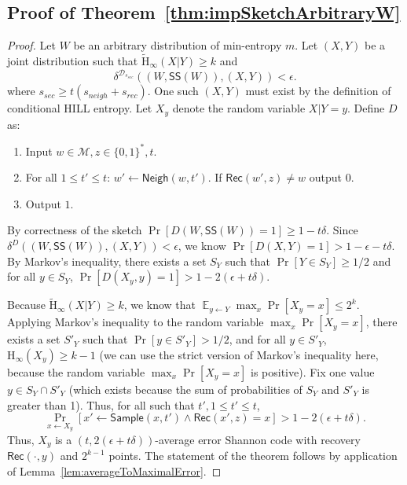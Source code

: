 \documentclass[11pt]{article}
\newcommand{\thref}[1]{\mbox{Theorem~\ref{#1}}}
\newcommand{\lemref}[1]{\mbox{Lemma~\ref{#1}}}
\DeclareMathOperator*{\expe}{\mathbb{E}}
\newcommand{\class}[1]{{\ensuremath{\mathsf{#1}}}}
\newcommand{\sketch}{\ensuremath{\class{SS}}\xspace}
\newcommand{\rec}{\ensuremath{\class{Rec}}\xspace}
\newcommand{\sample}{\ensuremath{\class{Sample}}\xspace}
\newcommand{\neigh}{\ensuremath{\class{Neigh}}\xspace}
\newcommand{\hill}{\ensuremath{\mathtt{HILL}}\xspace}
\newcommand{\Hoo}{\mathrm{H}_\infty}
\newcommand{\Hav}{\tilde{\mathrm{H}}_\infty}
\begin{document}
\subsection{Proof of \thref{thm:impSketchArbitraryW}}
\label{sec:proof of thm sketch implies code}
\begin{proof}
  Let $W$ be an arbitrary distribution of min-entropy $m$.  Let $(X, Y)$ be a joint distribution such that $\Hav(X | Y)\geq k$ and
\[ 
\delta^{\mathcal{D}_{s_{sec}}}((W, \sketch(W)), (X, Y))<\epsilon.
\]  
where  $s_{sec} \geq t(s_{neigh}+s_{rec})$.  One such $(X, Y)$ must exist by the definition of conditional HILL entropy. Let $X_y$ denote the random variable $X|Y=y$.
Define $D$ as:
\begin{enumerate}
\item Input $w\in\mathcal{M}, z \in\{0, 1\}^*, t$.
\item For all $1\leq t'\leq t$: 
\subitem  $w'\leftarrow \neigh(w, t')$.
\subitem If $\rec(w', z) \neq  w$ output $0$.
\item Output $1$.
\end{enumerate}
 By correctness of the sketch $ \Pr[D(W, \sketch(W)) =1]\ge 1-t\delta$.  Since 
$\delta^D((W, \sketch(W)), (X, Y))<\epsilon$, we know $\Pr[D(X, Y) = 1]>1-\epsilon-t\delta$.  By Markov's inequality,  there exists a set $S_Y$ such that $\Pr[Y\in S_Y]\ge 1/2$ and for all $y\in S_Y$, $\Pr[ D(X_y, y) =1]> 1- 2(\epsilon + t\delta)$.  

Because $\Hav(X | Y)\geq k$, we know that $\expe_{y\leftarrow Y} \max_x \Pr[X_y=x]\leq 2^k$.  Applying Markov's inequality to the random variable $\max_x \Pr[X_y=x]$, there exists a set $S'_Y$ such that $\Pr[y\in S'_Y]> 1/2$, and for all $y\in S'_Y$, $\Hoo(X_y)\ge k-1$ (we can use the strict version of Markov's inequality here, because the random variable $\max_x \Pr[X_y=x]$ is positive).  Fix one value $y \in S_Y\cap S'_Y$ (which exists because the sum of probabilities of $S_Y$ and $S'_Y$ is greater than 1).  
Thus, for all such that $t', 1\leq t'\leq t$, 
\[ \Pr_{x\leftarrow X_y}[x'\leftarrow \sample(x, t') \wedge \rec(x',z) = x]> 1-2(\epsilon+t\delta).\]  
Thus,  $X_y$ is a $(t, 2(\epsilon+t\delta))$-average error Shannon code with recovery $\rec(\cdot,y)$ and $2^{k-1}$ points.  The statement of the theorem follows by application of \lemref{lem:averageToMaximalError}.  
\end{proof}
\end{document}
